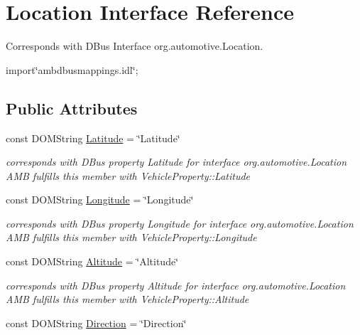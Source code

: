 \hypertarget{interfaceLocation}{\section{Location Interface Reference}
\label{interfaceLocation}
}


Corresponds with D\+Bus Interface org.\+automotive.\+Location.  




{\ttfamily import\char`\"{}ambdbusmappings.\+idl\char`\"{};}

\subsection*{Public Attributes}
\begin{DoxyCompactItemize}
\item 
\hypertarget{interfaceLocation_ae698fe48315e9e92946ea75721b26139}{const D\+O\+M\+String \hyperlink{interfaceLocation_ae698fe48315e9e92946ea75721b26139}{Latitude} = \char`\"{}Latitude\char`\"{}}\label{interfaceLocation_ae698fe48315e9e92946ea75721b26139}

\begin{DoxyCompactList}\small\item\em corresponds with D\+Bus property Latitude for interface org.\+automotive.\+Location A\+M\+B fulfills this member with Vehicle\+Property\+::\+Latitude \end{DoxyCompactList}\item 
\hypertarget{interfaceLocation_a5547f45ead8139cc78d98c09255afc4c}{const D\+O\+M\+String \hyperlink{interfaceLocation_a5547f45ead8139cc78d98c09255afc4c}{Longitude} = \char`\"{}Longitude\char`\"{}}\label{interfaceLocation_a5547f45ead8139cc78d98c09255afc4c}

\begin{DoxyCompactList}\small\item\em corresponds with D\+Bus property Longitude for interface org.\+automotive.\+Location A\+M\+B fulfills this member with Vehicle\+Property\+::\+Longitude \end{DoxyCompactList}\item 
\hypertarget{interfaceLocation_abd771571317087346843e2a644841661}{const D\+O\+M\+String \hyperlink{interfaceLocation_abd771571317087346843e2a644841661}{Altitude} = \char`\"{}Altitude\char`\"{}}\label{interfaceLocation_abd771571317087346843e2a644841661}

\begin{DoxyCompactList}\small\item\em corresponds with D\+Bus property Altitude for interface org.\+automotive.\+Location A\+M\+B fulfills this member with Vehicle\+Property\+::\+Altitude \end{DoxyCompactList}\item 
\hypertarget{interfaceLocation_af2a71548ea22d2db2027c81ffb131f08}{const D\+O\+M\+String \hyperlink{interfaceLocation_af2a71548ea22d2db2027c81ffb131f08}{Direction} = \char`\"{}Direction\char`\"{}}\label{interfaceLocation_af2a71548ea22d2db2027c81ffb131f08}


\end{DoxyCompactItemize}

